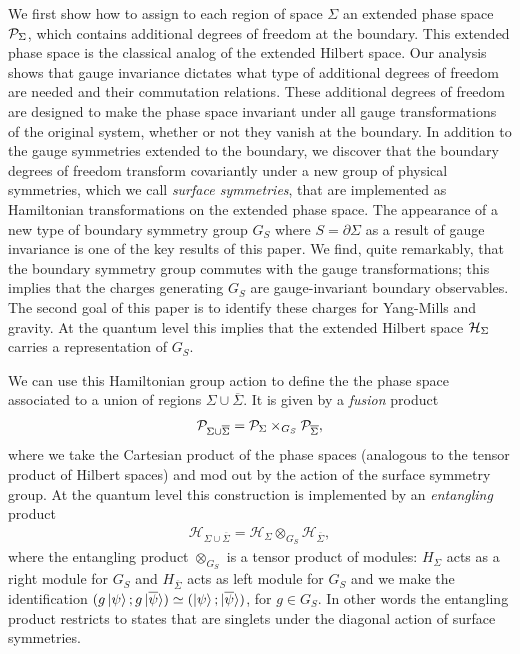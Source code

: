 \documentclass[a4paper,11pt]{article}
\newcommand{\beq}{\begin{eqnarray}}
\newcommand{\eeq}{\end{eqnarray}}
\begin{document}
We first show how to assign to each region of space $\Sigma$ an extended phase space ${\cal P}_\Sigma$, which contains additional degrees of freedom at the boundary.
This extended phase space is the classical analog of the extended Hilbert space.
Our analysis shows that gauge invariance dictates what type of additional degrees of freedom are needed and their commutation relations. 
These additional degrees of freedom are designed to make the phase space invariant under all gauge transformations of the original system, whether or not they vanish at the boundary. In addition to the gauge symmetries extended to the boundary, we discover that 
the boundary degrees of freedom transform covariantly under a new group of physical symmetries, which we call \emph{surface symmetries}, that are implemented as Hamiltonian transformations on the extended phase space. 
The appearance of a new type of boundary symmetry group $G_S$ where $S=\partial \Sigma$ as a result of gauge invariance is one of the key results of this paper.
We find, quite remarkably, that the boundary symmetry group commutes with the gauge transformations; this implies that the charges generating $G_S$ are gauge-invariant boundary observables. 
The second goal of this paper is to identify these charges for Yang-Mills and gravity.
 At the quantum level this implies that the extended Hilbert space ${\cal H}_\Sigma$ carries a representation of $G_S$.

We can  use this Hamiltonian group action to define the the phase space associated to a union of regions $\Sigma \cup \overline \Sigma$. It is given by a {\it fusion} product 
\beq 
{\cal P}_{ \Sigma \cup \overline \Sigma} = {\cal P}_\Sigma \times_{G_S}{\cal P}_{ \overline \Sigma},
\eeq where we take the Cartesian product of the phase spaces (analogous to the tensor product of Hilbert spaces) and mod out by the action of the surface symmetry group.
At the quantum level this construction is implemented by an {\it entangling} product 
\beq 
\mathcal{H}_{ \Sigma \cup \overline \Sigma} = \mathcal{H}_\Sigma \otimes_{G_S} \mathcal{H}_{ \overline \Sigma},
\eeq
where the entangling product $\otimes_{G_S}$ is a tensor product of modules:
${H}_\Sigma$ acts as a right module for $G_S$ and ${H}_{\overline \Sigma}$ acts as left module for $G_S$ and we make the identification $ ( g \ket{\psi} ; g \ket{\overline{\psi}} ) \simeq ( \ket{\psi} ; \ket{\overline{\psi}})$, for $g\in G_S$.
In other words the entangling product restricts to states that are singlets under the diagonal action of surface symmetries.
\end{document}
